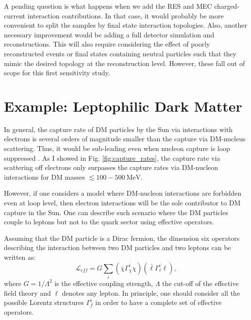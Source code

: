 A pending question is what happens when we add the RES and MEC charged-current interaction contributions. In that case, it would probably be more convenient to split the samples by final state interaction topologies. Also, another necessary improvement would be adding a full detector simulation and reconstructions. This will also require considering the effect of poorly reconstructed events or final states containing neutral particles such that they mimic the desired topology at the reconstruction level. However, these fall out of scope for this first sensitivity study.

\section{Example: Leptophilic Dark Matter}
\label{sec:dm_analysis_leptophilic_dm}

In general, the capture rate of DM particles by the Sun via interactions with electrons is several orders of magnitude smaller than the capture via DM-nucleus scattering. Thus, it would be sub-leading even when nucleon capture is loop suppressed \cite{Kopp2009}. As I showed in Fig. \ref{fig:capture_rates}, the capture rate via scattering off electrons only surpasses the capture rates via DM-nucleon interactions for DM masses $\lesssim 100 - 500 \ \mathrm{MeV}$.

However, if one considers a model where DM-nucleon interactions are forbidden even at loop level, then electron interactions will be the sole contributor to DM capture in the Sun. One can describe such scenario where the DM particles couple to leptons but not to the quark sector using effective operators.

Assuming that the DM particle is a Dirac fermion, the dimension six operators describing the interaction between two DM particles and two leptons can be written as:
\begin{equation}\label{7.1}
	\mathcal{L}_{eff} = G \sum_{i} \left(\bar{\chi} \Gamma^{i}_{\chi} \chi\right)\left(\bar{\ell} \Gamma^{i}_{\ell} \ell\right),
\end{equation}
where $G=1/\Lambda^{2}$ is the effective coupling strength, $\Lambda$ the cut-off of the effective field theory and $\ell$ denotes any lepton. In principle, one should consider all the possible Lorentz structures $\Gamma^{i}_{f}$ in order to have a complete set of effective operators.

